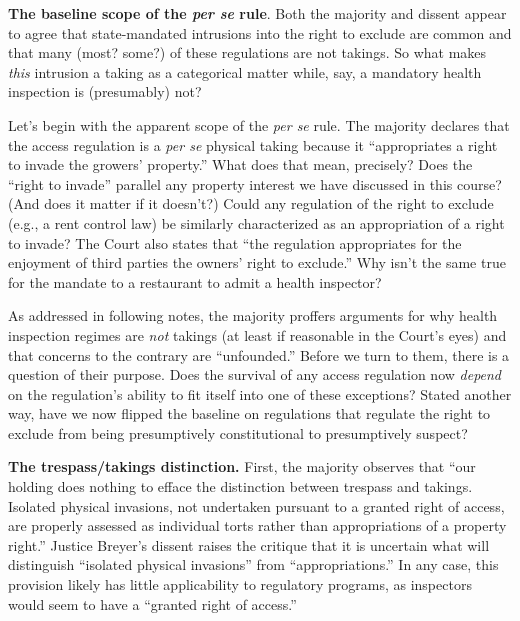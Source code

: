 
\item \textbf{The baseline scope of the \textit{per se} rule}.
Both the majority and dissent appear to agree that state-mandated intrusions
into the right to exclude are common and that many (most? some?) of these
regulations are not takings. So what makes \textit{this} intrusion a taking as a
categorical matter while, say, a mandatory health inspection is (presumably)
not? 

Let's begin with the apparent scope of the \textit{per se} rule. The
majority declares that the access regulation is a \textit{per se} physical
taking because it ``appropriates a right to invade the growers' property.'' What
does that mean, precisely? Does the ``right to invade'' parallel any property
interest we have discussed in this course? (And does it matter if it doesn't?)
Could any regulation of the right to exclude (e.g., a rent control law) be
similarly characterized as an appropriation of a right to invade? The Court also
states that ``the regulation appropriates for the enjoyment of third parties the
owners' right to exclude.'' Why isn't the same true for the mandate to a
restaurant to admit a health inspector?

As addressed in following notes, the majority proffers arguments for why
health inspection regimes are \textit{not} takings (at least if reasonable in
the Court's eyes) and that concerns to the contrary are ``unfounded.'' Before we
turn to them, there is a question of their purpose. Does the survival of any
access regulation now \textit{depend} on the regulation's ability to fit itself
into one of these exceptions? Stated another way, have we now flipped the
baseline on regulations that regulate the right to exclude from being
presumptively constitutional to presumptively suspect?

\item \textbf{The trespass/takings distinction.} First, the majority observes
that ``our holding does nothing to efface the distinction between trespass and
takings. Isolated physical invasions, not undertaken pursuant to a granted right
of access, are properly assessed as individual torts rather than appropriations
of a property right.'' Justice Breyer's dissent raises the critique that it is
uncertain what will distinguish ``isolated physical invasions'' from
``appropriations.'' In any case, this provision likely has little applicability
to regulatory programs, as inspectors would seem to have a ``granted right of
access.''

